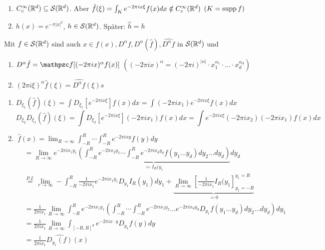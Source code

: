 \begin{beispiel}
	\begin{enumerate}
		\item $C_{c}^{\infty}(\mathbb{R}^{d}) \subseteq \mathcal{S}(\mathbb{R}^{d})$. Aber $\hat{f}(\xi) = \int_{K} e^{-2\pi i x \xi} f(x) dx \notin C_{c}^{\infty}(\mathbb{R}^{d})$ $(K = \operatorname{supp} f)$
		\item $h(x) = e^{-\pi |x|^{2}}$, $h \in \mathcal{S}(\mathbb{R}^{d})$. Später: $\hat{h} = h$
	\end{enumerate}
\end{beispiel}


\begin{satz} \label{satz:3.8}
	Mit $f \in \mathcal{S}(\mathbb{R}^{d})$ sind auch $x \in f(x), D^{\alpha}f, D^{\alpha}(\hat{f}), \widehat{D^{\alpha}f}$ in $\mathcal{S}(\mathbb{R}^{d})$ und
	\begin{enumerate}
		\item $D^{\alpha}\hat{f} = \ff[(-2\pi i x)^{\alpha} f(x)]$ $( (-2\pi i x)^{\alpha} = (-2\pi i)^{|\alpha|}\cdot x_{1}^{\alpha_{1}} \cdot \dotsc \cdot x_{d}^{\alpha_{d}})$
		\item $(2 \pi i \xi)^{\alpha} \hat{f}(\xi) = \widehat{D^{\alpha}f}(\xi)s$
	\end{enumerate}	
\end{satz}

\begin{beweis}
	\begin{enumerate}
		\item $D_{\xi_{1}}(\hat{f})(\xi) = \int D_{\xi_{1}}[e^{-2\pi i x \xi}]f(x) dx = \int (-2 \pi i x_{1})e^{-2\pi i x \xi} f(x) dx$
			\[ D_{\xi_{2}} D_{\xi_{1}} (\hat{f})(\xi) = \int D_{\xi_{2}} [e^{-2\pi i x \xi}] (-2\pi i x_{1})f(x) dx = \int e^{-2\pi i x \xi} (-2 \pi i x_{2})(-2 \pi i x_{1}) f(x) dx \]
		\item $~\hat{f}(x) = \lim_{R \rightarrow \infty} \int_{-R}^{R} \cdots \int_{-R}^{R} e^{-2 \pi i x y} f(y) dy$ 
			\begin{align*} 
				& = \lim_{R \rightarrow \infty} e^{-2 \pi i x_{1} y_{1}} \underbrace{\left( \int_{-R}^{R} e^{-2 \pi x_{2} y_{2}} \cdots \int_{-R}^{R} e^{-2 \pi i x_{d} y_{d}} f(y_{1} \dotsc y_{d}) dy_{2} \dotsc dy_{d} \right)}_{\eqqcolon I_{R}(y_{1}} dy_{d} ~ \\
				& \overset{P.I.}{=} \lim_{r \rightarrow \infty} - \int_{-R}^{R} \frac{1}{-2 \pi i x_{1}} e^{- 2 \pi i x_{1}y_{1}} D_{y_{1}} I_{R}(y_{1}) dy_{1} + \underbrace{\lim_{R \rightarrow \infty} \left[ \frac{1}{- 2 \pi i x_{1}} I_{R}(y_{1} \right]_{y_{1} = -R}^{y_{1} = R}}_{= 0} \\
				& = \frac{1}{2 \pi i x_{1}} \lim_{R \rightarrow \infty} \int_{-R}^{R} e^{-2 \pi i x_{1} y_{1}} \left( \int_{-R}^{R} \cdots \int_{-R}^{R} e^{-2 \pi i x_{2} y_{2}} \dotsc e^{-2 \pi i x_{d} y_{d}} D_{y_{1}} f(y_{1} \dotsc y_{d}) dy_{2} \dotsc dy_{d} \right) dy_{1} \\
				& = \frac{1}{2 \pi i x_{1}} \lim_{R \rightarrow \infty} \int_{[-R, R]^{d}} e^{-2 \pi i x \cdot y} D_{y_{1}} f(y) dy \\
				& = \frac{1}{2 \pi i x_{1}} \widehat{D_{y_{1}}(f)}(x)
			\end{align*}
	\end{enumerate}
\end{beweis}


